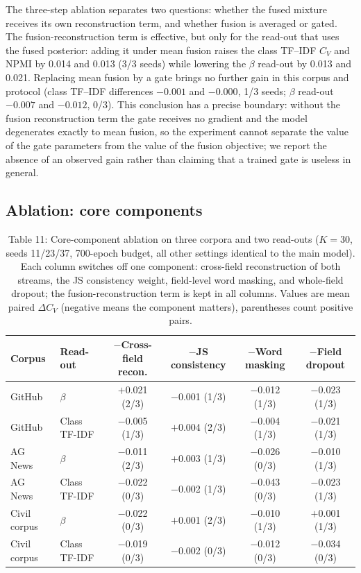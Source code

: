 \documentclass{article}
\begin{document}
The three-step ablation separates two questions: whether the fused mixture receives its own
reconstruction term, and whether fusion is averaged or gated. The fusion-reconstruction term is
effective, but only for the read-out that uses the fused posterior: adding it under mean fusion
raises the class TF--IDF $C_V$ and NPMI by 0.014 and 0.013 (3/3 seeds) while lowering the $\beta$
read-out by 0.013 and 0.021. Replacing mean fusion by a gate brings no further gain in this corpus
and protocol (class TF--IDF differences $-0.001$ and $-0.000$, 1/3 seeds; $\beta$ read-out
$-0.007$ and $-0.012$, 0/3). This conclusion has a precise boundary: without the fusion
reconstruction term the gate receives no gradient and the model degenerates exactly to mean fusion,
so the experiment cannot separate the value of the gate parameters from the value of the fusion
objective; we report the absence of an observed gain rather than claiming that a trained gate is
useless in general.

\subsection{Ablation: core components}

\begin{table}[t]
\centering
\caption{Table 11: Core-component ablation on three corpora and two read-outs ($K=30$, seeds 11/23/37, 700-epoch budget, all other settings identical to the main model). Each column switches off one component: cross-field reconstruction of both streams, the JS consistency weight, field-level word masking, and whole-field dropout; the fusion-reconstruction term is kept in all columns. Values are mean paired $\Delta C_V$ (negative means the component matters), parentheses count positive pairs.}
\label{tab:core-ablation}
\small
\setlength{\tabcolsep}{5pt}
\begin{tabular}{llcccc}
\toprule
Corpus & Read-out & $-$Cross-field recon. & $-$JS consistency & $-$Word masking & $-$Field dropout \\
\midrule
GitHub & $\beta$ & $+$0.021 (2/3) & $-$0.001 (1/3) & $-$0.012 (1/3) & $-$0.023 (1/3) \\
GitHub & Class TF-IDF & $-$0.005 (1/3) & $+$0.004 (2/3) & $-$0.004 (1/3) & $-$0.021 (1/3) \\
\midrule
AG News & $\beta$ & $-$0.011 (2/3) & $+$0.003 (1/3) & $-$0.026 (0/3) & $-$0.010 (1/3) \\
AG News & Class TF-IDF & $-$0.022 (0/3) & $-$0.002 (1/3) & $-$0.043 (0/3) & $-$0.023 (1/3) \\
\midrule
Civil corpus & $\beta$ & $-$0.022 (0/3) & $+$0.001 (2/3) & $-$0.010 (1/3) & $+$0.001 (1/3) \\
Civil corpus & Class TF-IDF & $-$0.019 (0/3) & $-$0.002 (0/3) & $-$0.012 (0/3) & $-$0.034 (0/3) \\
\bottomrule
\end{tabular}
\end{table}
\end{document}

